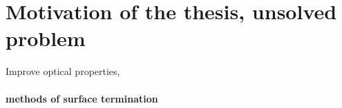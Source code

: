 
\section[Motivation of the thesis, unsolved problem]{Motivation of the thesis, unsolved problem}
Improve optical properties, 
\paragraph{methods of surface termination}
